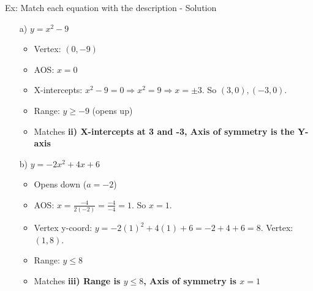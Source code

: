 \documentclass[aspectratio=169]{beamer}
\begin{document}
\begin{frame}{Ex: Match each equation with the description - Solution}
    \begin{tcolorbox}[colback=lightgray,colframe=accent,title=Detailed Solutions]
        \footnotesize
        \begin{enumerate}
            \item[a)] $y = x^2 - 9$
            \begin{itemize}
                \item Vertex: $(0,-9)$
                \item AOS: $x=0$
                \item X-intercepts: $x^2-9=0 \Rightarrow x^2=9 \Rightarrow x = \pm 3$. So $(3,0), (-3,0)$.
                \item Range: $y \ge -9$ (opens up)
                \item Matches \textbf{ii) X-intercepts at 3 and -3, Axis of symmetry is the Y-axis}
            \end{itemize}
            \item[b)] $y = -2x^2 + 4x + 6$
            \begin{itemize}
                \item Opens down ($a=-2$)
                \item AOS: $x = \frac{-4}{2(-2)} = \frac{-4}{-4} = 1$. So $x=1$.
                \item Vertex y-coord: $y = -2(1)^2 + 4(1) + 6 = -2 + 4 + 6 = 8$. Vertex: $(1,8)$.
                \item Range: $y \le 8$
                \item Matches \textbf{iii) Range is $y \le 8$, Axis of symmetry is $x = 1$}
            \end{itemize}
        \end{enumerate}
    \end{tcolorbox}
\end{frame}
\end{document}

